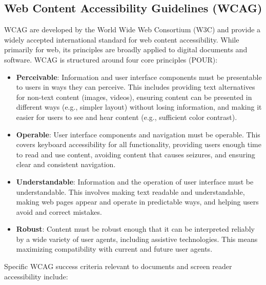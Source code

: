 \subsection{Web Content Accessibility Guidelines (WCAG)}
WCAG\cite{WCAG} are developed by the World Wide Web Consortium (W3C) and provide a widely accepted international standard for web content accessibility. While primarily for web, its principles are broadly applied to digital documents and software. WCAG is structured around four core principles (POUR):
\begin{itemize}
    \item \textbf{Perceivable}: Information and user interface components must be presentable to users in ways they can perceive. This includes providing text alternatives for non-text content (images, videos), ensuring content can be presented in different ways (e.g., simpler layout) without losing information, and making it easier for users to see and hear content (e.g., sufficient color contrast).
    \item \textbf{Operable}: User interface components and navigation must be operable. This covers keyboard accessibility for all functionality, providing users enough time to read and use content, avoiding content that causes seizures, and ensuring clear and consistent navigation.
    \item \textbf{Understandable}: Information and the operation of user interface must be understandable. This involves making text readable and understandable, making web pages appear and operate in predictable ways, and helping users avoid and correct mistakes.
    \item \textbf{Robust}: Content must be robust enough that it can be interpreted reliably by a wide variety of user agents, including assistive technologies. This means maximizing compatibility with current and future user agents.
\end{itemize}
Specific WCAG success criteria relevant to documents and screen reader accessibility include:
